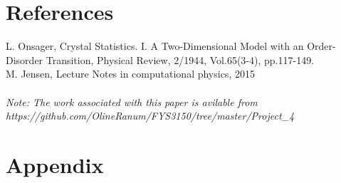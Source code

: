 \documentclass[%
reprint,nofootinbib,
amsmath,amssymb,
aps,
]{revtex4-1}
\begin{document}
\onecolumngrid 
\section{References} \noindent
[1] L. Onsager, Crystal Statistics. I. A Two-Dimensional Model with an Order-Disorder Transition, Physical Review, 2/1944, Vol.65(3-4), pp.117-149.\\ \noindent
[2] M. Jensen, Lecture Notes in computational physics, 2015 \\ 
\vspace{2cm} \\ 
\noindent 
\textit{Note: The work associated with this paper is avilable from https://github.com/OlineRanum/FYS3150/tree/master/Project\_4}
\newpage
\section{Appendix} \noindent
\end{document}
